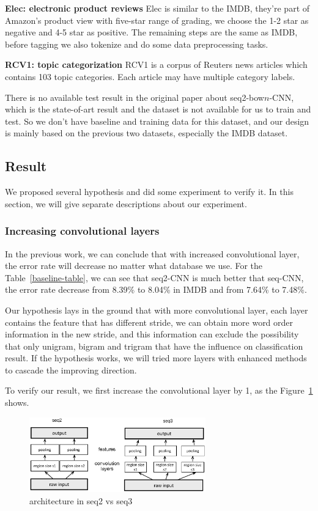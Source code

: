 {\bf Elec: electronic product reviews} Elec is similar to the IMDB, they're part
of Amazon's product view with five-star range of grading, we choose the 1-2 star
as negative and 4-5 star as positive. The remaining steps are the same as IMDB,
before tagging we also tokenize and do some data preprocessing tasks.


{\bf RCV1: topic categorization} RCV1 is a corpus of Reuters news articles which
contains 103 topic categories. Each article may have multiple category labels.


There is no available test result in the original paper about seq2-bow$n$-CNN, which
is the state-of-art result and the dataset is not available for us to train and test. 
So we don't have baseline and training data for this dataset, and our design is 
mainly based on the previous two datasets, especially the IMDB dataset.

\subsection{Result}
\label{ssec:result}

We proposed several hypothesis and did some experiment to verify it. In this section,
we will give separate descriptions about our experiment.

\subsubsection{Increasing convolutional layers}

In the previous work, we can conclude that with increased convolutional layer, the error
rate will decrease no matter what database we use. For the Table~\ref{baseline-table}, we
can see that seq2-CNN is much better that seq-CNN, the error rate decrease from 8.39\% to
8.04\% in IMDB and from 7.64\% to 7.48\%.

Our hypothesis lays in the ground that with more convolutional layer, each layer contains
the feature that has different stride, we can obtain more word order information in the new
stride, and this information can exclude the possibility that only unigram, bigram and trigram
that have the influence on classification result. If the hypothesis works, we will tried more
layers with enhanced methods to cascade the improving direction.

To verify our result, we first increase the convolutional layer by 1, as the Figure~\ref{seq-CNN-figure}
shows.

\begin{figure}
\includegraphics[width=3in]{seq2-CNN.eps}
\caption{\label{seq-CNN-figure} architecture in seq2 vs seq3}
\end{figure}

